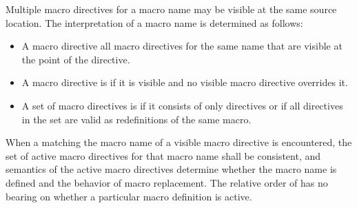 \begin{after}
\begin{std.txt}
\alinea
Multiple macro directives for a macro name may be visible at the same
source location.
The interpretation of a macro name is determined as follows:
\begin{itemize}
\item
\color{addclr}
A macro directive  all macro directives for the same name
that are visible at the point of the directive.
\item
\color{addclr}
A macro directive is  if it is visible and
no visible macro directive overrides it.
\item
\color{addclr}
A set of macro directives is  if it consists of only
 directives or if all  directives in the set
are valid as redefinitions of the same macro.
\end{itemize}
\color{addclr}
When a  matching the macro name of a visible
macro directive is encountered, the set of active macro directives for that
macro name shall be consistent, and semantics of the active macro directives
determine whether the macro name is defined and the behavior of macro
replacement.
\enternote
The relative order of  has no bearing on whether a
particular macro definition is active.
\exitnote
\end{std.txt}
\end{after}

